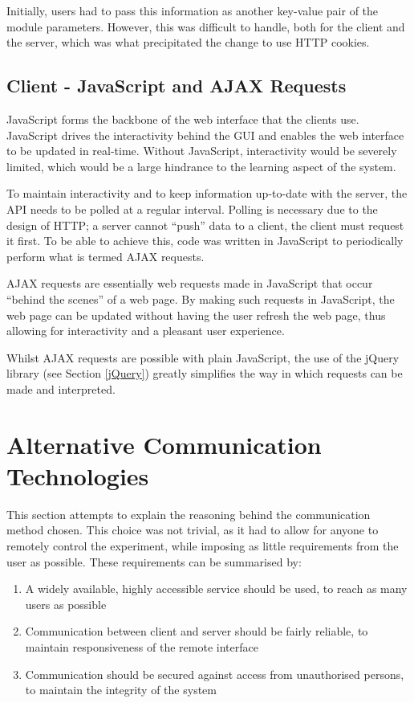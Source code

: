 Initially, users had to pass this information as another key-value pair of the module parameters. However, this was difficult to handle, both for the client and the server, which was what precipitated the change to use HTTP cookies.

\subsection{Client - JavaScript and AJAX Requests}

JavaScript forms the backbone of the web interface that the clients use. JavaScript drives the interactivity behind the GUI and enables the web interface to be updated in real-time. Without JavaScript, interactivity would be severely limited, which would be a large hindrance to the learning aspect of the system. 

To maintain interactivity and to keep information up-to-date with the server, the API needs to be polled at a regular interval. Polling is necessary due to the design of HTTP; a server cannot ``push'' data to a client, the client must request it first. To be able to achieve this, code was written in JavaScript to periodically perform what is termed AJAX requests. 

AJAX requests are essentially web requests made in JavaScript that occur ``behind the scenes'' of a web page. By making such requests in JavaScript, the web page can be updated without having the user refresh the web page, thus allowing for interactivity and a pleasant user experience.

Whilst AJAX requests are possible with plain JavaScript, the use of the jQuery library (see Section \ref{jQuery}) greatly simplifies the way in which requests can be made and interpreted.

\section{Alternative Communication Technologies}\label{Alternative Communication}

This section attempts to explain the reasoning behind the communication method chosen. This choice was not trivial, as it had to allow for anyone to remotely control the experiment, while imposing as little requirements from the user as possible. These requirements can be summarised by:
\begin{enumerate}
	\item A widely available, highly accessible service should be used, to reach as many users as possible
	\item Communication between client and server should be fairly reliable, to maintain responsiveness of the remote interface
	\item Communication should be secured against access from unauthorised persons, to maintain the integrity of the system
\end{enumerate}

